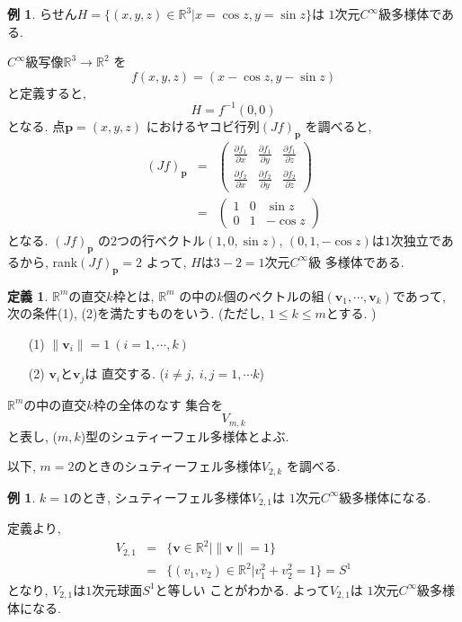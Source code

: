 \documentclass[a4j,12pt]{jarticle}
\theoremstyle{definition}
\newtheorem{definition}[theorem]{定義}
\newtheorem{example}[theorem]{例}
\begin{document}
\begin{example}
    らせん$H=\{(x,y,z)\in \mathbb{R}^3|
    x=\cos z, y=\sin z\}$は
    $1$次元$C^\infty$級多様体である. 

    $C^\infty$級写像$\mathbb{R}^3\to \mathbb{R}^2$
    を
    $$f(x,y,z)=(x-\cos z,y-\sin z)$$
    と定義すると, 
    $$H=f^{-1}(0,0)$$
    となる. 点$\boldsymbol{p}=(x,y,z)$
    におけるヤコビ行列$(Jf)_{\boldsymbol{p}}$
    を調べると, 
    \begin{eqnarray*}
        (Jf)_{\boldsymbol{p}}&=&
        \left(\begin{array}{ccc}
            \frac{\partial f_1}{\partial x}&
            \frac{\partial f_1}{\partial y}&
            \frac{\partial f_1}{\partial z}\\
            \frac{\partial f_2}{\partial x}&
            \frac{\partial f_2}{\partial y}&
            \frac{\partial f_2}{\partial z}
        \end{array}\right)\\
        &=&
        \left(\begin{array}{ccc}
            1&0&\sin z\\
            0&1&-\cos z
        \end{array}\right)
    \end{eqnarray*}
    となる. $(Jf)_{\boldsymbol{p}}$
    の$2$つの行ベクトル$(1,0,\sin z)$, 
    $(0,1,-\cos z)$は$1$次独立であるから, 
    rank$(Jf)_{\boldsymbol{p}}=2$
    よって, $H$は$3-2=1$次元$C^\infty$級
    多様体である. 
\end{example}
\begin{definition}\label{def:Stiefel manifold}
    $\mathbb{R}^m$の直交$k$枠とは, $\mathbb{R}^m$
    の中の$k$個のベクトルの組$(\boldsymbol{v}_1,
    \cdots ,\boldsymbol{v}_k)$であって, 
    次の条件(1), (2)を満たすものをいう. 
    (ただし, $1\leq k\leq m$とする. )
    \begin{itemize}
        \item[(1)]
        $\|\boldsymbol{v}_i\|=1\ (i=1,\cdots ,k)$
        \item[(2)] 
        $\boldsymbol{v}_i$と$\boldsymbol{v}_j$は
        直交する. ($i\neq j,\ i,j=1,\cdots k$)
    \end{itemize}

    $\mathbb{R}^m$の中の直交$k$枠の全体のなす
    集合を
    $$V_{m,k}$$
    と表し, ($m,k$)型のシュティーフェル多様体とよぶ. 
\end{definition}
以下, $m=2$のときのシュティーフェル多様体$V_{2,k}$
を調べる. 
\begin{example}
    $k=1$のとき, 
    シュティーフェル多様体$V_{2,1}$は
    $1$次元$C^\infty$級多様体になる. 

    定義より, 
    \begin{eqnarray*}
        V_{2,1}&=&\{\boldsymbol{v}\in
    \mathbb{R}^2|\|\boldsymbol{v}\|=1\}\\
    &=&\{(v_1,v_2)\in
    \mathbb{R}^2|v_1^2+v_2^2=1\}=S^1
    \end{eqnarray*}
    となり, $V_{2,1}$は$1$次元球面$S^1$と等しい
    ことがわかる. よって$V_{2,1}$は
    $1$次元$C^\infty$級多様体になる.
\end{example}
\end{document}

